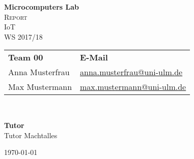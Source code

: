 \begin{titlepage}
\begin{center}
{\huge \bfseries Microcomputers Lab\\}%
\vfill
{\large \textsc{Report}}\\[9pt]
\vfill
{\large IoT}\\[9pt]
{\normalsize WS 2017/18}\\[9pt]
\vfill
\begin{minipage}{0.5\textwidth}
\normalsize
\begin{flushleft}
\begin{tabular}{@{}ll@{}} 
\textbf{Team 00} & \textbf{E-Mail}\\
Anna Musterfrau & \href{mailto:anna.musterfrau@uni-ulm.de}{anna.musterfrau@uni-ulm.de}\\
Max Mustermann & \href{mailto:max.mustermann@uni-ulm.de}{max.mustermann@uni-ulm.de}
\end{tabular}\\
\end{flushleft}
\end{minipage}
\hfill
\begin{minipage}{0.4\textwidth}
\normalsize
\begin{flushright}
\textbf{Tutor} \\
Tutor Machtalles
\end{flushright}
\end{minipage}
\vfill
{\normalsize \today}
\end{center}
\end{titlepage}